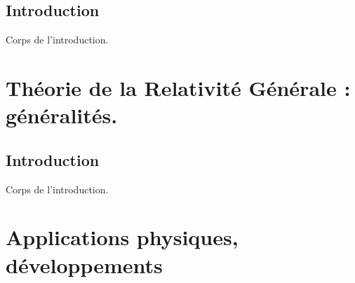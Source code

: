 \documentclass[french]{book} %
\theoremstyle{plain}
\begin{document}
\pagebreak

	\setcounter{tocdepth}{1} %
	\tableofcontents





	\pagebreak


\chapter*{Introduction}   %

	Corps de l'introduction.


\pagebreak





\part{Théorie de la Relativité Générale : généralités.}

	\chapter*{Introduction}   %

		Corps de l'introduction.

		

	\pagebreak


\part{Applications physiques, développements}


	

	

	
\end{document}
